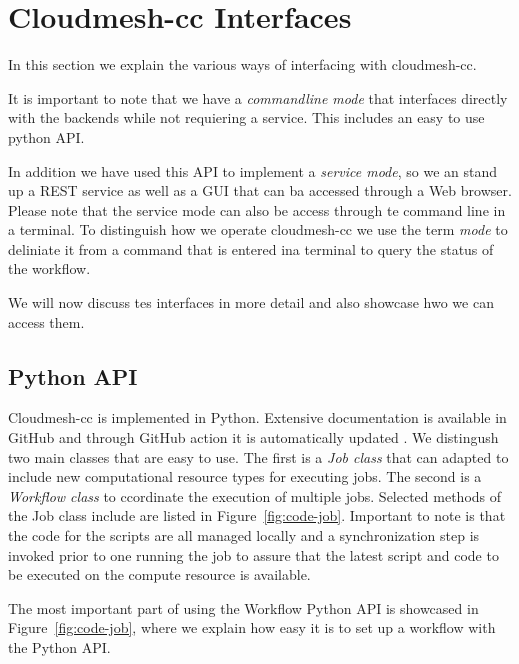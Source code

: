 
\section{Cloudmesh-cc Interfaces}

In this section we explain the various ways of interfacing with cloudmesh-cc.

It is important to note that we have a {\em commandline mode} that interfaces directly with the backends while not requiering a service. This includes an easy to use python API.

In addition we have used this API to implement a {\em service mode}, so we an stand up a REST service as well as a GUI that can ba accessed through a Web browser.
Please note that the service mode can also be access through te command line in a terminal. To distinguish how we operate cloudmesh-cc we use the term {\em mode} to deliniate it from a command that is entered ina terminal to query the status of the workflow.

We will now discuss tes interfaces in more detail and also showcase
hwo we can access them.


\subsection{Python API}

Cloudmesh-cc is implemented in Python. Extensive documentation is
available in GitHub and through GitHub action it is automatically
updated \cite{github-cloudmesh-cc}.  We distingush two main classes
that are easy to use. The first is a {\em Job class} that can adapted
to include new computational resource types for executing jobs. The
second is a {\em Workflow class} to ccordinate the execution of
multiple jobs. Selected methods of the Job class include are listed in
Figure~\ref{fig:code-job}. Important to note is that the code for the
scripts are all managed locally and a synchronization step is invoked
prior to one running the job to assure that the latest script and
code to be executed on the compute resource is available.

The most important part of using the Workflow Python API is showcased
in Figure~\ref{fig:code-job}, where we explain how easy it is to set up a workflow
with the Python API.

